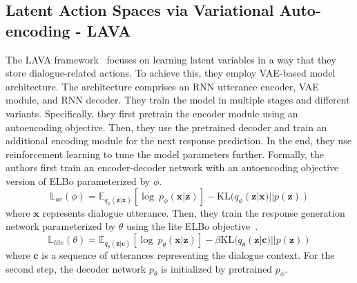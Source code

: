 \subsection{Latent Action Spaces via Variational Auto-encoding - LAVA}
\label{02:sec:lava}
The LAVA framework~\cite{lubis-etal-2020-lava} focuses on learning latent variables in a way that they store dialogue-related actions.
To achieve this, they employ VAE-based model architecture.
The architecture comprises an RNN utterance encoder, VAE module, and RNN decoder.
They train the model in multiple stages and different variants.
Specifically, they first pretrain the encoder module using an autoencoding objective.
Then, they use the pretrained decoder and train an additional encoding module for the next response prediction.
In the end, they use reinforcement learning to tune the model parameters further.
Formally, the authors first train an encoder-decoder network with an autoencoding objective version of ELBo parameterized by $\phi$.
\begin{equation}
    \mathbb{L}_{ae}(\phi) = \mathbb{E}_{q_{\phi}(\mathbf{z}|\mathbf{x})}[\log~p_{\phi}(\mathbf{x}|\mathbf{z})] -\mathrm{KL}(q_{\phi}(\mathbf{z}|\mathbf{x})||p(\mathbf{z}))
\end{equation}
where $\mathbf{x}$ represents dialogue utterance.
Then, they train the response generation network parameterized by $\theta$ using the lite ELBo objective~\cite{lubis-etal-2020-lava}.
\begin{equation}
    \mathbb{L}_{lite}(\theta) = \mathbb{E}_{q_{\theta}(\mathbf{z}|\mathbf{c})}[\log~p_{\theta}(\mathbf{x}|\mathbf{z})] - \beta\mathrm{KL}(q_{\theta}(\mathbf{z}|\mathbf{c})||p(\mathbf{z}))
\end{equation}
where $\mathbf{c}$ is a sequence of utterances representing the dialogue context.
For the second step, the decoder network $p_{\theta}$ is initialized by pretrained $p_{\phi}$.

